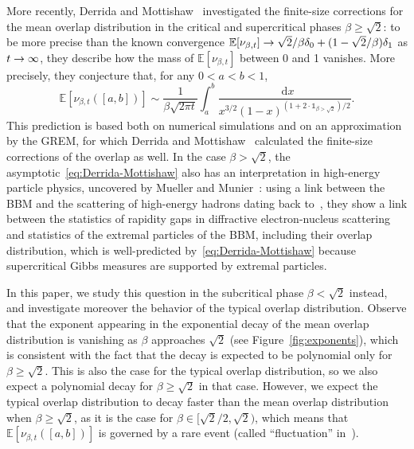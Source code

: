 \documentclass[AHL,Unicode,longabstracts,published]{cedram}
\renewcommand{\d}[1]{\mathop{}\!\mathrm{d}#1}
\newcommand{\E}{\mathbb{E}}
\newcommand\1{\mathds{1}}
\renewcommand*{\to}{\mathchoice{\longrightarrow}{\rightarrow}{\rightarrow}{\rightarrow}}
\begin{document}
More recently, Derrida and Mottishaw~\cite{DerridaMottishaw2016} investigated the finite-size corrections for the mean overlap distribution in the critical and supercritical phases $\beta \geq \sqrt{2}$: to be more precise than the known convergence $\E[\nu_{\beta,t}] \to \sqrt{2}/\beta \delta_0 + (1-\sqrt{2}/\beta) \delta_1$ as $t \to\infty$, they describe how the mass of $\E[\nu_{\beta,t}]$ between 0 and 1 vanishes. More precisely, they conjecture that, for any $0<a<b<1$,
\begin{equation}\label{eq:Derrida-Mottishaw}
\E[\nu_{\beta,t}([a,b])]
\sim \frac{1}{\beta \sqrt{2 \pi t}} \int_a^b \frac{\d{x}}{x^{3/2} (1-x)^{(1+2\cdot \1_{\beta>\sqrt{2}})/2}}.
\end{equation}
This prediction is based both on numerical simulations and on an approximation by the GREM, for which Derrida and Mottishaw~\cite{DerridaMottishaw2018} calculated the finite-size corrections of the overlap as well. In the case $\beta>\sqrt{2}$, the asymptotic~\eqref{eq:Derrida-Mottishaw} also has an interpretation in high-energy particle physics, uncovered by Mueller and Munier~\cite{MuellerMunier2018a,MuellerMunier2018b}: using a link between the BBM and the scattering of high-energy hadrons dating back to~\cite{IancuMuellerMunier2005}, they show a link between the statistics of rapidity gaps in diffractive electron-nucleus scattering and statistics of the extremal particles of the BBM, including their overlap distribution, which is well-predicted by~\eqref{eq:Derrida-Mottishaw} because supercritical Gibbs measures are supported by extremal particles.


In this paper, we study this question in the subcritical phase $\beta < \sqrt{2}$ instead, and investigate moreover the behavior of the typical overlap distribution. Observe that the exponent appearing in the exponential decay of the mean overlap distribution is vanishing as $\beta$ approaches $\sqrt{2}$ (see Figure~\ref{fig:exponents}), which is consistent with the fact that the decay is expected to be polynomial only for $\beta \geq \sqrt{2}$. This is also the case for the typical overlap distribution, so we also expect a polynomial decay for $\beta \geq \sqrt{2}$ in that case. However, we expect the typical overlap distribution to decay faster than the mean overlap distribution when $\beta \geq \sqrt{2}$, as it is the case for $\beta \in [\sqrt{2}/2,\sqrt{2})$, which means that $\E[\nu_{\beta,t}([a,b])]$ is governed by a rare event (called ``fluctuation'' in~\cite{MuellerMunier2018a}).
\end{document}
